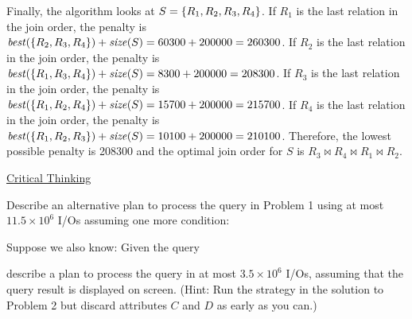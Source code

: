 \begin{sol}
    Finally, the algorithm looks at $S = \{R_1, R_2, R_3, R_4\}$. If $R_1$ is the last relation in the join order, the penalty is $\mathit{best}(\{R_2, R_3, R_4\}) + \mathit{size}(S) = 60300 + 200000 = 260300$. If $R_2$ is the last relation in the join order, the penalty is $\mathit{best}(\{R_1, R_3, R_4\}) + \mathit{size}(S) = 8300 + 200000 = 208300$.
    If $R_3$ is the last relation in the join order, the penalty is $\mathit{best}(\{R_1, R_2, R_4\}) + \mathit{size}(S) = 15700 + 200000 = 215700$.
    If $R_4$ is the last relation in the join order, the penalty is $\mathit{best}(\{R_1, R_2, R_3\}) + \mathit{size}(S) = 10100 + 200000 = 210100$. Therefore, the lowest possible penalty is 208300 and the optimal join order for $S$ is $R_3 \bowtie R_4 \bowtie R_1 \bowtie R_2$.
\end{sol}


\vgap

\begin{center}
    \uline{Critical Thinking}
\end{center}



 Describe an alternative plan to process the query in Problem 1 using at most $11.5 \times 10^6$ I/Os assuming one more condition:

%
%
%


 Suppose we also know:
Given the query



\noindent describe a plan to process the query in at most $3.5 \times 10^6$ I/Os, assuming that the query result is displayed on screen.
(Hint: Run the strategy in the solution to Problem 2 but discard attributes $C$ and $D$ as early as you can.)


